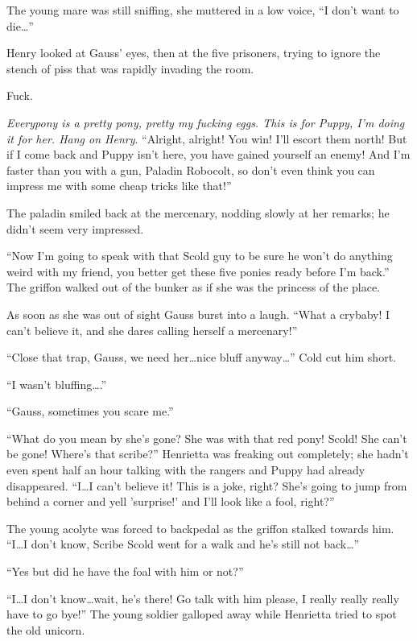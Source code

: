 The young mare was still sniffing, she muttered in a low voice, ``I don't want to die\dots''

Henry looked at Gauss' eyes, then at the five prisoners, trying to ignore the stench of piss that was rapidly invading the room.

Fuck.

\emph{Everypony is a pretty pony, pretty my fucking eggs. This is for Puppy, I'm doing it for her. Hang on Henry}. ``Alright, alright! You win! I'll escort them north! But if I come back and Puppy isn't here, you have gained yourself an enemy! And I'm faster than you with a gun, Paladin Robocolt, so don't even think you can impress me with some cheap tricks like that!''

The paladin smiled back at the mercenary, nodding slowly at her remarks; he didn't seem very impressed.

``Now I'm going to speak with that Scold guy to be sure he won't do anything weird with my friend, you better get these five ponies ready before I'm back.'' The griffon walked out of the bunker as if she was the princess of the place.

As soon as she was out of sight Gauss burst into a laugh. ``What a crybaby! I can't believe it, and she dares calling herself a mercenary!''

``Close that trap, Gauss, we need her\dots nice bluff anyway\dots'' Cold cut him short.

``I wasn't bluffing\dots.''

``Gauss, sometimes you scare me.''

\horizonline


``What do you mean by she's gone? She was with that red pony! Scold! She can't be gone! Where's that scribe?'' Henrietta was freaking out completely; she hadn't even spent half an hour talking with the rangers and Puppy had already disappeared. ``I\dots I can't believe it! This is a joke, right? She's going to jump from behind a corner and yell 'surprise!' and I'll look like a fool, right?''

The young acolyte was forced to backpedal as the griffon stalked towards him. ``I\dots I don't know, Scribe Scold went for a walk and he's still not back\dots''

``Yes but did he have the foal with him or not?''

``I\dots I don't know\dots wait, he's there! Go talk with him please, I really really really have to go bye!'' The young soldier galloped away while Henrietta tried to spot the old unicorn.

